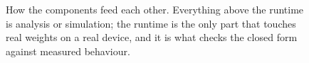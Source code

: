 \begin{figure}[htbp]
\caption{How the components feed each other. Everything above the runtime is
analysis or simulation; the runtime is the only part that touches real weights on
a real device, and it is what checks the closed form against measured behaviour.}
\label{fig:method}
\end{figure}
